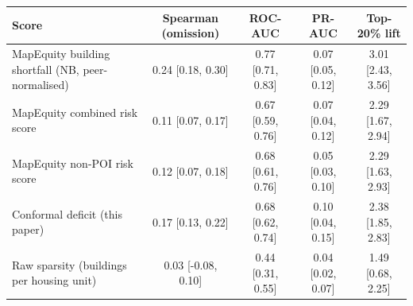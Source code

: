 \begin{tabular}{lcccc}\toprule
Score & Spearman (omission) & ROC-AUC & PR-AUC & Top-20\% lift\\\midrule
MapEquity building shortfall (NB, peer-normalised) & 0.24 [0.18, 0.30] & 0.77 [0.71, 0.83] & 0.07 [0.05, 0.12] & 3.01 [2.43, 3.56]\\
MapEquity combined risk score & 0.11 [0.07, 0.17] & 0.67 [0.59, 0.76] & 0.07 [0.04, 0.12] & 2.29 [1.67, 2.94]\\
MapEquity non-POI risk score & 0.12 [0.07, 0.18] & 0.68 [0.61, 0.76] & 0.05 [0.03, 0.10] & 2.29 [1.63, 2.93]\\
Conformal deficit (this paper) & 0.17 [0.13, 0.22] & 0.68 [0.62, 0.74] & 0.10 [0.04, 0.15] & 2.38 [1.85, 2.83]\\
Raw sparsity (buildings per housing unit) & 0.03 [-0.08, 0.10] & 0.44 [0.31, 0.55] & 0.04 [0.02, 0.07] & 1.49 [0.68, 2.25]\\
\bottomrule\end{tabular}

